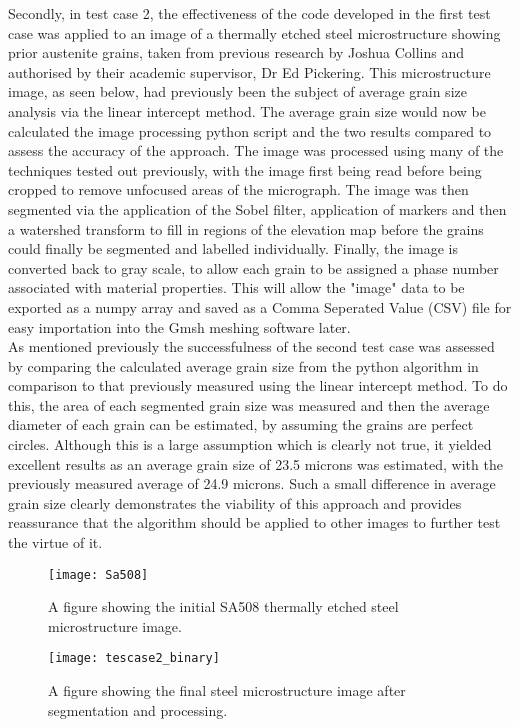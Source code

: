 \documentclass[\report.tex]{subfiles}
\begin{document}
\noindent Secondly, in test case 2, the effectiveness of the code developed in the first test case was applied to an image of a thermally etched steel microstructure showing prior austenite grains, taken from previous research by Joshua Collins and authorised by their academic supervisor, Dr Ed Pickering. This microstructure image, as seen below, had previously been the subject of average grain size analysis via the linear intercept method. The average grain size would now be calculated the image processing python script and the two results compared to assess the accuracy of the approach. The image was processed using many of the techniques tested out previously, with the image first being read before being cropped to remove unfocused areas of the micrograph. The image was then segmented via the application of the Sobel filter, application of markers and then a watershed transform to fill in regions of the elevation map before the grains could finally be segmented and labelled individually. Finally, the image is converted back to gray scale, to allow each grain to be assigned a phase number associated with material properties. This will allow the "image" data to be exported as a numpy array and saved as a Comma Seperated Value (CSV) file for easy importation into the Gmsh meshing software later.\\

\noindent As mentioned previously the successfulness of the second test case was assessed by comparing the calculated average grain size from the python algorithm in comparison to that previously measured using the linear intercept method. To do this, the area of each segmented grain size was measured and then the average diameter of each grain can be estimated, by assuming the grains are perfect circles. Although this is a large assumption which is clearly not true, it yielded excellent results as an average grain size of 23.5 microns was estimated, with the previously measured average of 24.9 microns. Such a small difference in average grain size clearly demonstrates the viability of this approach and provides reassurance that the algorithm should be applied to other images to further test the virtue of it.\\

\begin{figure}
\centering
\parbox{6cm}{
\texttt{[image: Sa508]}
\caption{A figure showing the initial SA508 thermally etched steel microstructure image.}
\label{fig:2figsA}}
\qquad
\begin{minipage}{7cm}
\texttt{[image: tescase2\_binary]}
\caption{A figure showing the final steel microstructure image after segmentation and processing.}
\label{fig:2figsB}
\end{minipage}
\end{figure}
\end{document}
